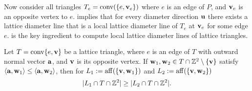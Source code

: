 %      

Now consider all triangles $T_e=\operatorname{conv}(\{e,\mathbf{v}_e\})$ where $e$ is an edge of $P$, and $\mathbf{v}_e$ is an opposite vertex to $e$.  implies that for every diameter direction $\mathbf{u}$ there exists a lattice diameter line that is a local lattice diameter line of $T_e$ at $\mathbf{v}_e$ for some edge $e$.  is the key ingredient to compute local lattice diameter lines of lattice triangles.

\begin{lemma}\label{lemma:min-gens}
    Let $T = \operatorname{conv} \{e,\mathbf{v}\}$ be a lattice triangle, where $e$ is an edge of $T$ with outward normal vector $\mathbf{a}$, and $\mathbf{v}$ is its opposite vertex. If $\mathbf{w}_1,\mathbf{w}_2 \in T \cap \mathbb{Z}^2 \setminus \{\mathbf{v}\}$ satisfy $\langle \mathbf{a}, \mathbf{w}_1 \rangle \leq \langle \mathbf{a}, \mathbf{w}_2 \rangle$, then for $L_1:= \operatorname{aff}(\{\mathbf{v},\mathbf{w}_1\})$ and $L_2:= \operatorname{aff}(\{\mathbf{v},\mathbf{w}_2\})$
    \[
    |L_1 \cap T \cap \mathbb{Z}^2| \geq |L_2 \cap T \cap \mathbb{Z}^2|.
    \]
\end{lemma}

